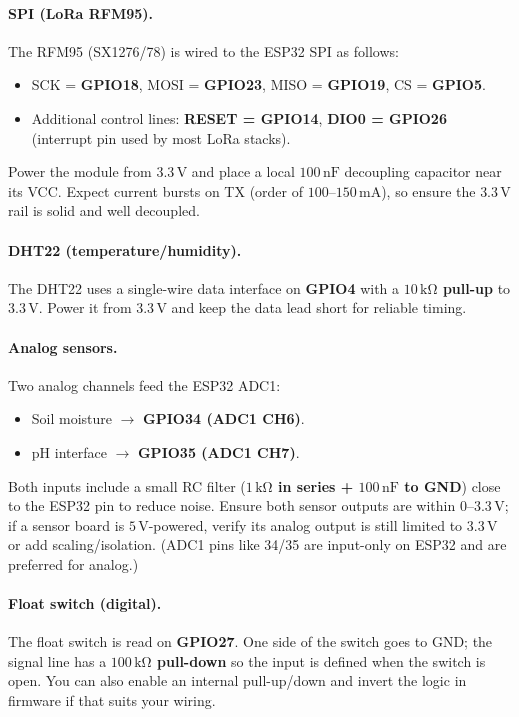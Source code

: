 \documentclass[12pt,onecolumn]{IEEEtran} %
\begin{document}
\paragraph{SPI (LoRa RFM95).}
The RFM95 (SX1276/78) is wired to the ESP32 SPI as follows:
\begin{itemize}
  \item SCK = \textbf{GPIO18}, MOSI = \textbf{GPIO23}, MISO = \textbf{GPIO19}, CS = \textbf{GPIO5}.
  \item Additional control lines: \textbf{RESET = GPIO14}, \textbf{DIO0 = GPIO26} (interrupt pin used by most LoRa stacks).
\end{itemize}
Power the module from $3.3\,\mathrm{V}$ and place a local $100\,\mathrm{nF}$ decoupling capacitor near its VCC.  
Expect current bursts on TX (order of $100$--$150\,\mathrm{mA}$), so ensure the $3.3\,\mathrm{V}$ rail is solid and well decoupled.

\paragraph{DHT22 (temperature/humidity).}
The DHT22 uses a single-wire data interface on \textbf{GPIO4} with a \textbf{$10\,\mathrm{k\Omega}$ pull-up} to $3.3\,\mathrm{V}$.  
Power it from $3.3\,\mathrm{V}$ and keep the data lead short for reliable timing.

\paragraph{Analog sensors.}
Two analog channels feed the ESP32 ADC1:
\begin{itemize}
  \item Soil moisture $\rightarrow$ \textbf{GPIO34 (ADC1 CH6)}.
  \item pH interface $\rightarrow$ \textbf{GPIO35 (ADC1 CH7)}.
\end{itemize}
Both inputs include a small RC filter (\textbf{$1\,\mathrm{k\Omega}$ in series + $100\,\mathrm{nF}$ to GND}) close to the ESP32 pin
to reduce noise.  
Ensure both sensor outputs are within $0$--$3.3\,\mathrm{V}$; if a sensor board is $5\,\mathrm{V}$-powered, verify its analog
output is still limited to $3.3\,\mathrm{V}$ or add scaling/isolation.  
(ADC1 pins like 34/35 are input-only on ESP32 and are preferred for analog.)

\paragraph{Float switch (digital).}
The float switch is read on \textbf{GPIO27}. One side of the switch goes to GND; the signal line has a \textbf{$100\,\mathrm{k\Omega}$ pull-down}
so the input is defined when the switch is open.  
You can also enable an internal pull-up/down and invert the logic in firmware if that suits your wiring.
\end{document}
